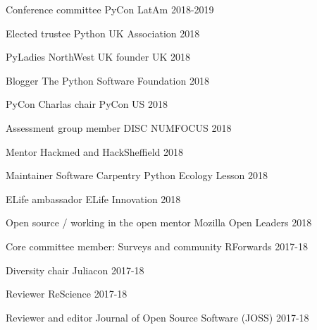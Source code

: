


\begin{cvpress}

\cvpres
{Conference committee}
{PyCon LatAm}
{2018-2019}

\cvpres
{Elected trustee} %
{Python UK Association}
{2018}

\cvpres
{PyLadies NorthWest UK founder} %
{UK}
{2018}

\cvpres
{Blogger} %
{The Python Software Foundation}
{2018}

\cvpres
{PyCon Charlas chair} %
{PyCon US}
{2018}


\cvpres
{Assessment group member}
{DISC NUMFOCUS}
{2018}

\cvpres
{Mentor}
{Hackmed and HackSheffield}
{2018}

\cvpres
{Maintainer} %
{Software Carpentry Python Ecology Lesson}
{2018}

\cvpres
{ELife ambassador}
{ELife Innovation}
{2018}

\cvpres
{Open source / working in the open mentor} %
{Mozilla Open Leaders} %
{2018} %

\cvpres
{Core committee member: Surveys and community} %
{RForwards}
{2017-18} %

\cvpres
{Diversity chair} %
{Juliacon} %
{2017-18} %

\cvpres
{Reviewer} %
{ReScience} %
{2017-18} %


\cvpres
{Reviewer and editor} %
{Journal of Open Source Software (JOSS)} %
{2017-18} %




\end{cvpress}

